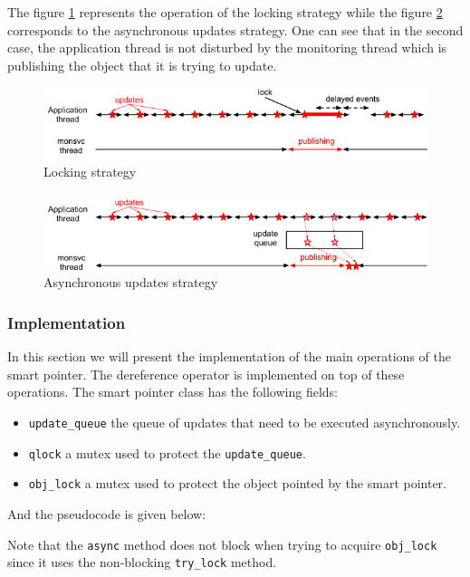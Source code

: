 The figure \ref{fig:sync_ptr} represents the operation of the locking strategy while the figure \ref{fig:async_ptr} corresponds to the asynchronous updates strategy. One can see that in the second case, the application thread is not disturbed by the monitoring thread which is publishing the object that it is trying to update.
\begin{figure}[ht!]
\centering
\includegraphics[scale=0.6]{Images/async_before.png}
\caption{Locking strategy}
\label{fig:sync_ptr}
\end{figure}

\begin{figure}[ht!]
\centering
\includegraphics[scale=0.6]{Images/async_after.png}
\caption{Asynchronous updates strategy}
\label{fig:async_ptr}
\end{figure}

\subsubsection*{Implementation}

In this section we will present the implementation of the main operations of the smart pointer. The dereference operator is implemented on top of these operations. The smart pointer class has the following fields:
\begin{itemize}
\item {\tt update\_queue} the queue of updates that need to be executed asynchronously.
\item {\tt qlock} a mutex used to protect the {\tt update\_queue}.
\item {\tt obj\_lock} a mutex used to protect the object pointed by the smart pointer.
\end{itemize}
And the pseudocode is given below:

Note that the {\tt async} method does not block when trying to acquire {\tt obj\_lock} since it uses the non-blocking {\tt try\_lock} method. 

